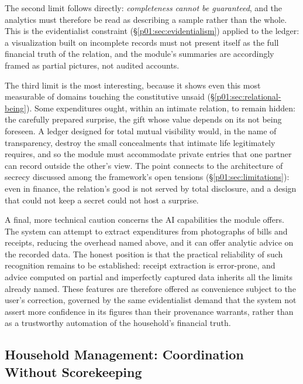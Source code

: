 \documentclass[11pt,a4paper]{article}
\begin{document}
The second limit follows directly: \emph{completeness cannot be guaranteed}, and the analytics must therefore be read as describing a sample rather than the whole. This is the evidentialist constraint (§\ref{p01:sec:evidentialism}) applied to the ledger: a visualization built on incomplete records must not present itself as the full financial truth of the relation, and the module's summaries are accordingly framed as partial pictures, not audited accounts.

The third limit is the most interesting, because it shows even this most measurable of domains touching the constitutive unsaid (§\ref{p01:sec:relational-being}). Some expenditures ought, within an intimate relation, to remain hidden: the carefully prepared surprise, the gift whose value depends on its not being foreseen. A ledger designed for total mutual visibility would, in the name of transparency, destroy the small concealments that intimate life legitimately requires, and so the module must accommodate private entries that one partner can record outside the other's view. The point connects to the architecture of secrecy discussed among the framework's open tensions (§\ref{p01:sec:limitations}): even in finance, the relation's good is not served by total disclosure, and a design that could not keep a secret could not host a surprise.

A final, more technical caution concerns the AI capabilities the module offers. The system can attempt to extract expenditures from photographs of bills and receipts, reducing the overhead named above, and it can offer analytic advice on the recorded data. The honest position is that the practical reliability of such recognition remains to be established: receipt extraction is error-prone, and advice computed on partial and imperfectly captured data inherits all the limits already named. These features are therefore offered as convenience subject to the user's correction, governed by the same evidentialist demand that the system not assert more confidence in its figures than their provenance warrants, rather than as a trustworthy automation of the household's financial truth.

\subsection{Household Management: Coordination Without Scorekeeping}\label{p01:sec:housework}
\end{document}
